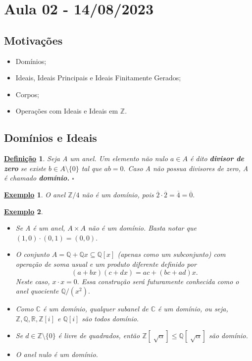 \documentclass{article}
\newtheorem*{def*}{\underline{Defini\c c\~ao}}
\newtheorem{example}{\underline{Exemplo}}
\begin{document}
\section{Aula 02 - 14/08/2023}
\subsection{Motivações}
\begin{itemize}
  \item Domínios;
  \item Ideais, Ideais Principais e Ideais Finitamente Gerados;
  \item Corpos;
  \item Operações com Ideais e Ideais em \(\mathbb{Z}\).
\end{itemize}
\subsection{Domínios e Ideais}
\begin{def*}
  Seja A um anel. Um elemento não nulo \(a\in A\) é dito \textbf{divisor de zero} se existe \(b\in A\setminus{\{0\}}\) tal que
  \(ab = 0.\) Caso A não possua divisores de zero, A é chamado \textbf{domínio.} \(\square\)
\end{def*}
\begin{example}
  O anel \(\mathbb{Z}/4\) não é um domínio, pois \(\overline{2}\cdot \overline{2} = \overline{4} = \overline{0}.\)
\end{example}
\begin{example}
  \begin{itemize}
    \item[1)] Se A é um anel, \(A\times A\) não é um domínio. Basta notar que \((1, 0)\cdot (0, 1) = (0, 0).\)
    \item[2)] O conjunto \(A = \mathbb{Q} + \mathbb{Q}x \subseteq{\mathbb{Q}[x]}\) (apenas como um subconjunto) com operação de soma usual e um
      produto diferente definido por 
      \[
        (a+bx)(c+dx) = ac + (bc+ad)x.
      \]
      Neste caso, \(x \cdot x = 0.\) Essa construção será futuramente conhecida como o anel quociente \(\mathbb{Q}/(x^{2}).\)
    \item[3)] Como \(\mathbb{C}\) é um domínio, qualquer subanel de \(\mathbb{C}\) é um domínio, ou seja, \(\mathbb{Z}, \mathbb{Q}, \mathbb{R}, \mathbb{Z}[i]\) e \(\mathbb{Q}[i]\)
      são todos domínio.
    \item[4)] Se \(d\in \mathbb{Z}\setminus{\{0\}}\) é livre de quadrados, então \(\mathbb{Z}[\sqrt[]{\alpha }]\leq \mathbb{Q}[\sqrt[]{\alpha }] \) são domínio.
    \item[5)] O anel nulo é um domínio.
  \end{itemize}
\end{example}
\end{document}
